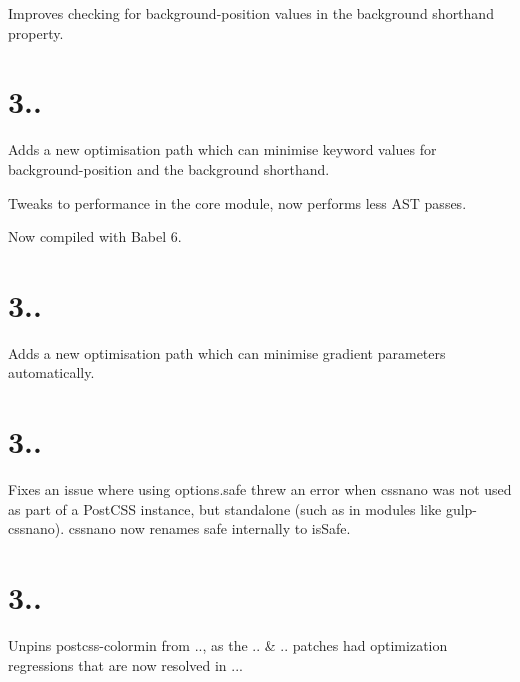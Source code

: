 \begin{DoxyItemize}
\item Improves checking for {\ttfamily background-\/position} values in the {\ttfamily background} shorthand property.
\end{DoxyItemize}

\section*{3..}


\begin{DoxyItemize}
\item Adds a new optimisation path which can minimise keyword values for {\ttfamily background-\/position} and the {\ttfamily background} shorthand.
\item Tweaks to performance in the {\ttfamily core} module, now performs less A\+ST passes.
\item Now compiled with Babel 6.
\end{DoxyItemize}

\section*{3..}


\begin{DoxyItemize}
\item Adds a new optimisation path which can minimise gradient parameters automatically.
\end{DoxyItemize}

\section*{3..}


\begin{DoxyItemize}
\item Fixes an issue where using {\ttfamily options.\+safe} threw an error when cssnano was not used as part of a Post\+C\+SS instance, but standalone (such as in modules like gulp-\/cssnano). cssnano now renames {\ttfamily safe} internally to {\ttfamily is\+Safe}.
\end{DoxyItemize}

\section*{3..}


\begin{DoxyItemize}
\item Unpins postcss-\/colormin from {..}, as the {..} \& {..} patches had optimization regressions that are now resolved in {..}.
\end{DoxyItemize}

